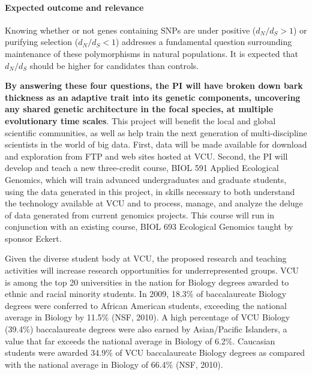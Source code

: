 \paragraph{Expected outcome and relevance}  Knowing whether or not genes containing SNPs are under positive ($d_N/d_S > 1$) or 
purifying selection ($d_N/d_S < 1$) addresses a fundamental question surrounding maintenance of these polymorphisms in 
natural populations.  It is expected that $d_N/d_S$ should be higher for candidates than controls.

\textbf{By answering these four questions, the PI will have broken down bark thickness as an adaptive trait into 
its genetic components, uncovering any shared genetic architecture in the focal species, at multiple evolutionary time scales}.  
This project will benefit the local and global scientific communities, as well as help train 
the next generation of multi-discipline scientists in the world of big data.  First, data will be made 
available for download and exploration from FTP and web sites hosted at VCU.  Second, the PI will develop and teach a new 
three-credit course, BIOL 591 Applied Ecological Genomics, which will train advanced undergraduates and 
graduate students, using the data generated in this project, in skills necessary to both understand the 
technology available at VCU and to process, manage, and analyze the deluge of data generated from current genomics 
projects.  This course will run in conjunction with an existing course, BIOL 693 Ecological Genomics taught by sponsor Eckert.

Given the diverse student body at VCU, the proposed research and 
teaching activities will increase research opportunities for underrepresented groups. VCU is among the top 20 universities in the 
nation for Biology degrees awarded to ethnic and racial minority students. In 2009, 18.3\% of baccalaureate Biology degrees were 
conferred to African American students, exceeding the national average in Biology by 11.5\% (NSF, 2010). A high percentage of 
VCU Biology (39.4\%) baccalaureate degrees were also earned by Asian/Pacific Islanders, a value that far exceeds the 
national average in Biology of 6.2\%. Caucasian students were awarded 34.9\% of VCU baccalaureate Biology degrees as 
compared with the national average in Biology of 66.4\% (NSF, 2010).

